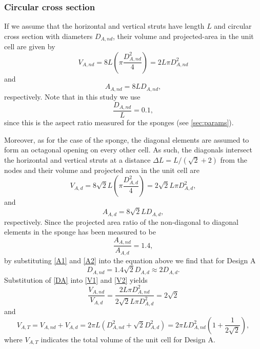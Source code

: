 \documentclass[10pt,twoside]{fernandes_supp}
\begin{document}
\subsubsection{Circular cross section} 
If we assume that the horizontal and vertical struts have length $L$ and circular cross section  with diameters $D_{A,nd}$, their volume and projected-area in the unit cell are given by 
\begin{equation}\label{V1}
V_{A,nd}=8 L \left(\pi\frac{D^2_{A,nd}}{4}\right)=2 L \pi D^2_{A,nd}
\end{equation}
and
\begin{equation}\label{A1}
A_{A,nd}=8 L D_{A,nd},
\end{equation}
respectively. Note that in this study we use 
\begin{equation}
\frac{D_{A,nd}}{L}=0.1,
\end{equation}
since this is the aspect ratio measured for the sponges (see \cref{sec:params}).

Moreover, as for the case of the sponge, the diagonal elements are assumed to form an octagonal opening on every other cell. As such, the diagonals intersect the horizontal and vertical struts at a distance $\Delta L=L/(\sqrt{2}+2)$ from the nodes and their  volume and projected area in the unit cell are
\begin{equation}\label{V2}
V_{A,d}=8 \sqrt{2} L\left(\pi\frac{D^2_{A,d}}{4}\right)=2\sqrt{2}L \pi D^2_{A,d},
\end{equation}
and
\begin{equation}\label{A2}
A_{A,d}=8\sqrt{2} L D_{A,d},
\end{equation}
respectively. Since the projected area ratio of the non-diagonal to diagonal elements in the sponge has been measured to be 
\begin{equation}
\frac{A_{A,nd}}{A_{A,d}}=1.4,
\end{equation}
by substituting \cref{A1} and \cref{A2} into the equation above we find that for Design A
\begin{equation} \label{DA}
D_{A,nd}=1.4\sqrt{2}D_{A,d}\approx 2 D_{A,d}.
\end{equation}
Substitution of \cref{DA} into \cref{V1} and \cref{V2} yields 
\begin{equation}
\frac{V_{A,nd}}{V_{A,d}}=\frac{2 L \pi D^2_{A,nd}}{2\sqrt{2}L \pi D^2_{A,d}}=2\sqrt{2}
\end{equation}
and
\begin{equation}\label{VT}
V_{A,T}=V_{A,nd}+V_{A,d}=2\pi L (D_{A,nd}^2+\sqrt{2} D_{A,d}^2)=2\pi L D_{A,nd}^2 \left(1+\frac{1}{2\sqrt{2}}\right),
\end{equation}
where $V_{A,T}$ indicates the total volume of the unit cell for Design A. 
\end{document}
